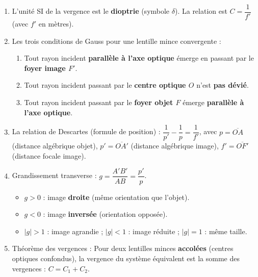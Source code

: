 \documentclass[11pt]{article}
\begin{document}
\begin{corrige}
\begin{enumerate}
    \item L'unité SI de la vergence est le \textbf{dioptrie} (symbole $\delta$). La relation est $C = \dfrac{1}{f'}$ (avec $f'$ en mètres).
    \item Les trois conditions de Gauss pour une lentille mince convergente :
    \begin{enumerate}
        \item Tout rayon incident \textbf{parallèle à l'axe optique} émerge en passant par le \textbf{foyer image $F'$}.
        \item Tout rayon incident passant par le \textbf{centre optique $O$} n'est \textbf{pas dévié}.
        \item Tout rayon incident passant par le \textbf{foyer objet $F$} émerge \textbf{parallèle à l'axe optique}.
    \end{enumerate}
    \item La relation de Descartes (formule de position) : $\dfrac{1}{p'} - \dfrac{1}{p} = \dfrac{1}{f'}$, avec $p = \overline{OA}$ (distance algébrique objet), $p' = \overline{OA'}$ (distance algébrique image), $f' = \overline{OF'}$ (distance focale image).
    \item Grandissement transverse : $g = \dfrac{A'B'}{AB} = \dfrac{p'}{p}$.
    \begin{itemize}
        \item $g > 0$ : image \textbf{droite} (même orientation que l'objet).
        \item $g < 0$ : image \textbf{inversée} (orientation opposée).
        \item $|g| > 1$ : image agrandie ; $|g| < 1$ : image réduite ; $|g| = 1$ : même taille.
    \end{itemize}
    \item Théorème des vergences : Pour deux lentilles minces \textbf{accolées} (centres optiques confondus), la vergence du système équivalent est la somme des vergences : $C = C_1 + C_2$.
\end{enumerate}
\end{corrige}
\end{document}
